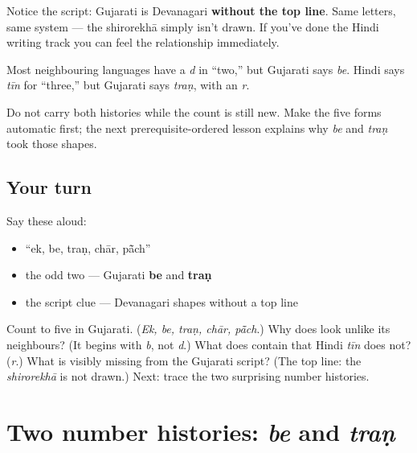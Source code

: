 Notice the script: Gujarati is Devanagari \textbf{without the top line}. Same letters, same system — the shirorekhā simply isn't drawn. If you've done the Hindi writing track you can feel the relationship immediately.

\begin{grammarlens}[title={What you've built: two surprises and a headless script}]
Most neighbouring languages have a \emph{d} in “two,” but Gujarati says \textbf{} \emph{be}. Hindi says \emph{tīn} for “three,” but Gujarati says \textbf{} \emph{traṇ}, with an \emph{r}.

Do not carry both histories while the count is still new. Make the five forms automatic first; the next prerequisite-ordered lesson explains why \emph{be} and \emph{traṇ} took those shapes.
\end{grammarlens}

\subsection*{Your turn}
Say these aloud:

\begin{itemize}
\raggedright
  \item \textquotedblleft{}ek, be, traṇ, chār, pā̃ch\textquotedblright{}
  \item the odd two — Gujarati \textbf{be} and \textbf{traṇ}
  \item the script clue — Devanagari shapes without a top line
\end{itemize}

\begin{tcolorbox}[breakable,colback=teal!4,colframe=teal!35!black,title={Before you move on}]
Count to five in Gujarati. (\emph{Ek, be, traṇ, chār, pā̃ch}.) Why does \textbf{} look unlike its neighbours? (It begins with \emph{b}, not \emph{d}.) What does \textbf{} contain that Hindi \emph{tīn} does not? (\emph{r}.) What is visibly missing from the Gujarati script? (The top line: the \emph{shirorekhā} is not drawn.) Next: trace the two surprising number histories.
\end{tcolorbox}
\section[be · traṇ]{Two number histories: \emph{be} and \emph{traṇ}}

\label{lesson:GU-C06-number-histories}



